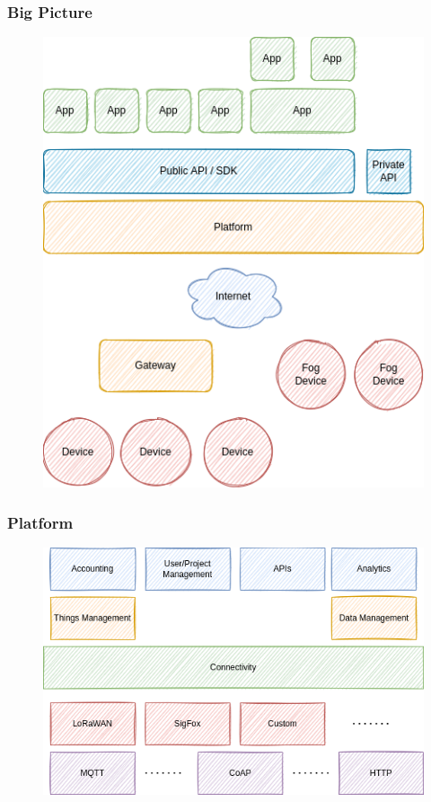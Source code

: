 \documentclass{../iot-lecture}
\begin{document}
\begin{frame}
  \frametitle{Big Picture}
  \begin{figure}
    \includegraphics[height=.8\textheight]{./img/big-picture.png}
  \end{figure}
\end{frame}

\begin{frame}
  \frametitle{Platform}
  \begin{figure}
    \includegraphics[width=\textwidth]{./img/platform.png}
  \end{figure}
\end{frame}
\end{document}
